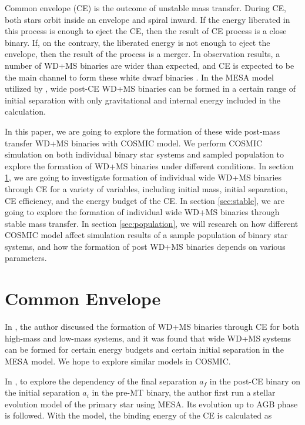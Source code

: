 \documentclass[linenumbers]{aastex631}
\begin{document}
Common envelope (CE) is the outcome of unstable mass transfer. During CE, both stars orbit inside an envelope and spiral inward. If the energy liberated in this process is enough to eject the CE, then the result of CE process is a close binary. If, on the contrary, the liberated energy is not enough to eject the envelope, then the result of the process is a merger. In observation results, a number of WD+MS binaries are wider than expected, and CE is expected to be the main channel to form these white dwarf binaries \cite{yamaguchi_hi, yamaguchi_lo}. In the MESA model utilized by \cite{yamaguchi_hi, yamaguchi_lo}, wide post-CE WD+MS binaries can be formed in a certain range of initial separation with only gravitational and internal energy included in the calculation. 

In this paper, we are going to explore the formation of these wide post-mass transfer WD+MS binaries with COSMIC model. We perform COSMIC simulation on both individual binary star systems and sampled population to explore the formation of WD+MS binaries under different conditions. In section \ref{sec:ce}, we are going to investigate formation of individual wide WD+MS binaries through CE for a variety of variables, including initial mass, initial separation, CE efficiency, and the energy budget of the CE. In section \ref{sec:stable}, we are going to explore the formation of individual wide WD+MS binaries through stable mass transfer. In section \ref{sec:population}, we will research on how different COSMIC model affect simulation results of a sample population of binary star systems, and how the formation of post WD+MS binaries depends on various parameters.

\section{Common Envelope} \label{sec:ce}
In \cite{yamaguchi_hi, yamaguchi_lo}, the author discussed the formation of WD+MS binaries through CE for both high-mass and low-mass systems, and it was found that wide WD+MS systems can be formed for certain energy budgets and certain initial separation in the MESA model. We hope to explore similar models in COSMIC.

In \cite{yamaguchi_hi, yamaguchi_lo}, to explore the dependency of the final separation $a_f$ in the post-CE binary on the initial separation $a_i$ in the pre-MT binary, the author first run a stellar evolution model of the primary star using MESA. Its evolution up to AGB phase is followed. With the model, the binding energy of the CE is calculated as
\end{document}
